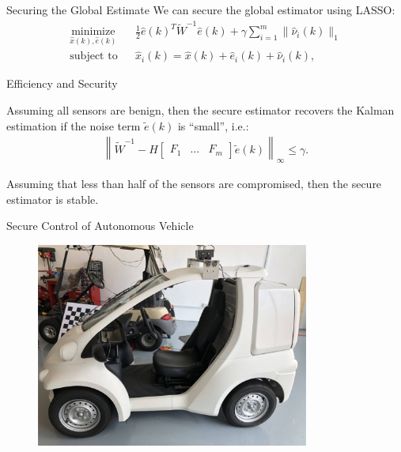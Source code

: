 \documentclass[10pt]{beamer}
\begin{document}
\begin{frame}{Securing the Global Estimate}
  We can secure the global estimator using LASSO:
  \begin{align*}
    &\mathop{\textrm{minimize}}\limits_{\hat x(k),\hat e(k)}&
    & \frac{1}{2}\hat e(k)^T \tilde W^{-1} \hat e(k) + \gamma \sum_{i=1}^m \|\hat \nu_i(k)\|_1\\
    &\textrm{subject to} &
    &\hat x_i(k)  =  \hat x(k) + \hat e_i(k)+\hat \nu_i(k),&
  \end{align*}
\end{frame}

\begin{frame}{Efficiency and Security}
  \begin{theorem}
    Assuming all sensors are benign, then the secure estimator recovers the Kalman estimation if the noise term $\tilde e(k)$ is ``small'', i.e.:
    \begin{align*}
      \left\|\tilde W^{-1} - H \begin{bmatrix}
          F_1&\dots&F_m
        \end{bmatrix}\tilde e(k) \right\|_\infty\leq \gamma.  
    \end{align*}
  \end{theorem}
  \begin{theorem}
    Assuming that less than half of the sensors are compromised, then the secure estimator is stable.
  \end{theorem}
\end{frame}

\begin{frame}{Secure Control of Autonomous Vehicle}
\begin{figure}[ht]
  \centering
  \includegraphics[width=0.8\textwidth]{singpilot.jpg}
\end{figure}

\end{frame}
\end{document}
